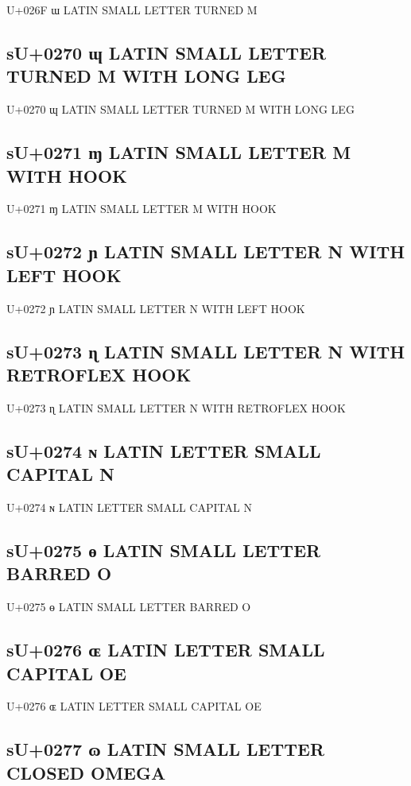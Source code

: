 U+026F ɯ LATIN SMALL LETTER TURNED M

\subsection{sU+0270 ɰ LATIN SMALL LETTER TURNED M WITH LONG LEG}

U+0270 ɰ LATIN SMALL LETTER TURNED M WITH LONG LEG

\subsection{sU+0271 ɱ LATIN SMALL LETTER M WITH HOOK}

U+0271 ɱ LATIN SMALL LETTER M WITH HOOK

\subsection{sU+0272 ɲ LATIN SMALL LETTER N WITH LEFT HOOK}

U+0272 ɲ LATIN SMALL LETTER N WITH LEFT HOOK

\subsection{sU+0273 ɳ LATIN SMALL LETTER N WITH RETROFLEX HOOK}

U+0273 ɳ LATIN SMALL LETTER N WITH RETROFLEX HOOK

\subsection{sU+0274 ɴ LATIN LETTER SMALL CAPITAL N}

U+0274 ɴ LATIN LETTER SMALL CAPITAL N

\subsection{sU+0275 ɵ LATIN SMALL LETTER BARRED O}

U+0275 ɵ LATIN SMALL LETTER BARRED O

\subsection{sU+0276 ɶ LATIN LETTER SMALL CAPITAL OE}

U+0276 ɶ LATIN LETTER SMALL CAPITAL OE

\subsection{sU+0277 ɷ LATIN SMALL LETTER CLOSED OMEGA}

